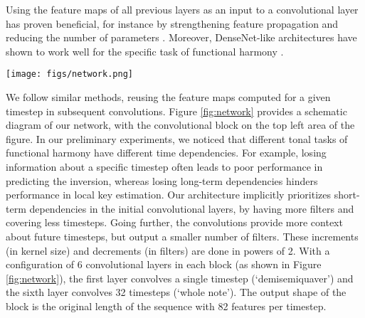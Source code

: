 

Using the feature maps of all previous layers as an input to
a convolutional layer has proven beneficial, for instance by
strengthening feature propagation and reducing the number of
parameters \parencite{huang2017densely}. Moreover, DenseNet-like
architectures have shown to work well for the specific task
of functional harmony \parencite{micchi2020not}.

\begin{figure*}
 \centerline{\texttt{[image: figs/network.png]}}
 \caption{\emph{AugmentedNet}. The bass and chroma inputs
 are processed through independent convolutional blocks and
 then concatenated. Both convolutional blocks are identical
 and expanded on the top of the figure. A convolutional
 block has six 1D convolutional layers. Each layer doubles
 the kernel size (number of timesteps covered) and halves
 the number of output filters, prioritizing short-term
 dependencies but providing long-term context that benefits
 the subsequent GRU layers.}
 \label{fig:network}
\end{figure*}

We follow similar methods, reusing the feature maps computed
for a given timestep in subsequent convolutions. Figure
\ref{fig:network} provides a schematic diagram of our
network, with the convolutional block on the top left area
of the figure. In our preliminary experiments, we noticed
that different tonal tasks of functional harmony have
different time dependencies. For example, losing information
about a specific timestep often leads to poor performance in
predicting the inversion, whereas losing long-term
dependencies hinders performance in local key estimation.
Our architecture implicitly prioritizes short-term
dependencies in the initial convolutional layers, by having
more filters and covering less timesteps. Going further, the
convolutions provide more context about future timesteps,
but output a smaller number of filters. These increments (in
kernel size) and decrements (in filters) are done in powers
of 2. With a configuration of 6 convolutional layers in each
block (as shown in Figure \ref{fig:network}), the first
layer convolves a single timestep (`demisemiquaver') and the
sixth layer convolves 32 timesteps (`whole note'). The
output shape of the block is the original length of the
sequence with 82 features per timestep.
